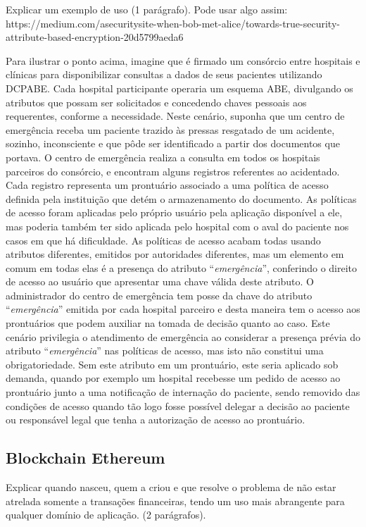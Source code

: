 \documentclass[a4paper,11pt]{article}
\begin{document}
{\color{ForestGreen}Explicar um exemplo de uso (1 parágrafo). Pode usar algo assim: https://medium.com/asecuritysite-when-bob-met-alice/towards-true-security-attribute-based-encryption-20d5799aeda6}

Para ilustrar o ponto acima, imagine que é firmado um consórcio entre hospitais e clínicas para disponibilizar consultas a dados de seus pacientes utilizando DCPABE.
Cada hospital participante operaria um esquema ABE, divulgando os atributos que possam ser solicitados e concedendo chaves pessoais aos requerentes, conforme a necessidade.
Neste cenário, suponha que um centro de emergência receba um paciente trazido às pressas resgatado de um acidente, sozinho, inconsciente e que pôde ser identificado a partir dos documentos que portava.
O centro de emergência realiza a consulta em todos os hospitais parceiros do consórcio, e encontram alguns registros referentes ao acidentado.
Cada registro representa um prontuário associado a uma política de acesso definida pela instituição que detém o armazenamento do documento.
As políticas de acesso foram aplicadas pelo próprio usuário pela aplicação disponível a ele, mas poderia também ter sido aplicada pelo hospital com o aval do paciente nos casos em que há dificuldade.
As políticas de acesso acabam todas usando atributos diferentes, emitidos por autoridades diferentes, mas um elemento em comum em todas elas é a presença do atributo ``\emph{emergência}'', conferindo o direito de acesso ao usuário que apresentar uma chave válida deste atributo.
O administrador do centro de emergência tem posse da chave do atributo ``\emph{emergência}'' emitida por cada hospital parceiro e desta maneira tem o acesso aos prontuários que podem auxiliar na tomada de decisão quanto ao caso.
Este cenário privilegia o atendimento de emergência ao considerar a presença prévia do atributo ``\emph{emergência}'' nas políticas de acesso, mas isto não constitui uma obrigatoriedade.
Sem este atributo em um prontuário, este seria aplicado sob demanda, quando por exemplo um hospital recebesse um pedido de acesso ao prontuário junto a uma notificação de internação do paciente, sendo removido das condições de acesso quando tão logo fosse possível delegar a decisão ao paciente ou responsável legal que tenha a autorização de acesso ao prontuário.

\subsection{Blockchain Ethereum}

{\color{ForestGreen}Explicar quando nasceu, quem a criou e que resolve o problema de não estar atrelada somente a transações financeiras, tendo um uso mais abrangente para qualquer domínio de aplicação. (2 parágrafos).}
\end{document}

